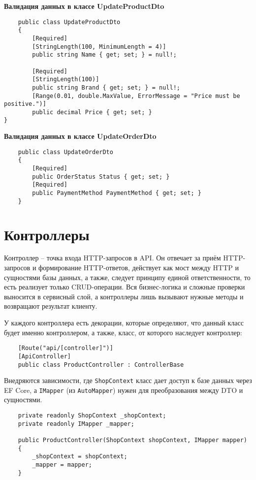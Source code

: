 \documentclass[a4paper,12pt]{report}
\begin{document}
\textbf{Валидация данных в классе UpdateProductDto}
\begin{verbatim}
    public class UpdateProductDto
    {
        [Required]
        [StringLength(100, MinimumLength = 4)]
        public string Name { get; set; } = null!;

        [Required]
        [StringLength(100)]
        public string Brand { get; set; } = null!;
        [Range(0.01, double.MaxValue, ErrorMessage = "Price must be positive.")]
        public decimal Price { get; set; }
}
\end{verbatim}

\textbf{Валидация данных в классе UpdateOrderDto}
\begin{verbatim}
    public class UpdateOrderDto
    {
        [Required]
        public OrderStatus Status { get; set; }
        [Required]
        public PaymentMethod PaymentMethod { get; set; }
    }
\end{verbatim}

\section{Контроллеры}

Контроллер -- точка входа HTTP-запросов в \acs{API}. Он отвечает за приём \acs{HTTP}-запросов и формирование \acs{HTTP}-ответов, 
действует как мост между \acs{HTTP} и сущностями базы данных, а также, следует принципу единой ответственности, то есть реализует 
только \acs{CRUD}-операции. Вся бизнес-логика и сложные проверки выносится в сервисный слой, а контроллеры лишь вызывают нужные 
методы и возвращают результат клиенту.

У каждого контроллера есть декорации, которые определяют, что данный класс будет именно контроллером, 
а также, класс, от которого наследует контроллер:
\begin{verbatim}
    [Route("api/[controller]")]
    [ApiController]
    public class ProductController : ControllerBase
\end{verbatim}

Внедряются зависимости, где \texttt{ShopContext} класс дает доступ к базе данных через \acs{EF} Core, а \texttt{IMapper} (из \texttt{AutoMapper}) 
нужен для преобразования между \acs{DTO} и сущностями.
\begin{verbatim}
    private readonly ShopContext _shopContext;
    private readonly IMapper _mapper;
    
    public ProductController(ShopContext shopContext, IMapper mapper)
    {
        _shopContext = shopContext;
        _mapper = mapper;
    }    
\end{verbatim}
\end{document}

